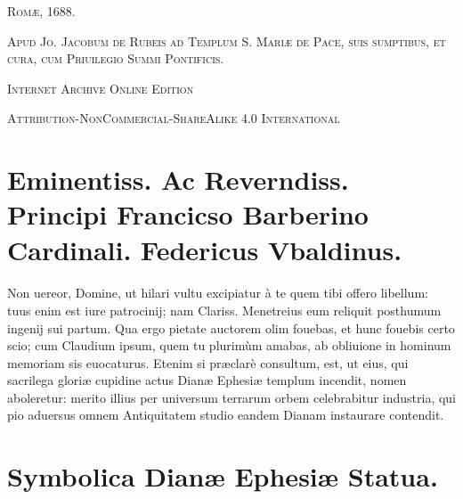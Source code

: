 \documentclass[a4paper, 11pt, oneside, polutonikogreek, latin]{article}
\begin{document}
\begin{titlepage}
	\vspace{1\baselineskip}

	{\small\scshape Romæ, 1688.}
	
	{\small\scshape{Apud Jo. Jacobum de Rubeis ad Templum S. Mariæ de Pace, suis sumptibus, et cura, cum Priuilegio Summi Pontificis.}}
	
	\vspace{0.5\baselineskip} %

\scshape Internet Archive Online Edition%
	
	{\scshape\small Attribution-NonCommercial-ShareAlike 4.0 International} %
\end{titlepage}
\setlength{\parskip}{1mm plus1mm minus1mm}
\clearpage
\tableofcontents
\clearpage
\section*{ Eminentiss. Ac Reverndiss. Principi Francicso Barberino Cardinali. Federicus Vbaldinus.}
\paragraph{}
Non uereor, Domine, ut hilari vultu excipiatur à te quem tibi offero libellum: tuus enim est iure patrocinij; nam Clariss. Menetreius eum reliquit posthumum ingenij sui partum. Qua ergo pietate auctorem olim fouebas, et hunc fouebis certo scio; cum Claudium ipsum, quem tu plurimùm amabas, ab obliuione in hominum memoriam sis euocaturus. Etenim si præclarè consultum, est, ut eius, qui sacrilega gloriæ cupidine actus Dianæ Ephesiæ templum incendit, nomen aboleretur: merito illius per universum terrarum orbem celebrabitur industria, qui pio aduersus omnem Antiquitatem studio eandem Dianam instaurare contendit.
\clearpage
\section{Symbolica Dianæ Ephesiæ Statua.}
\end{document}
